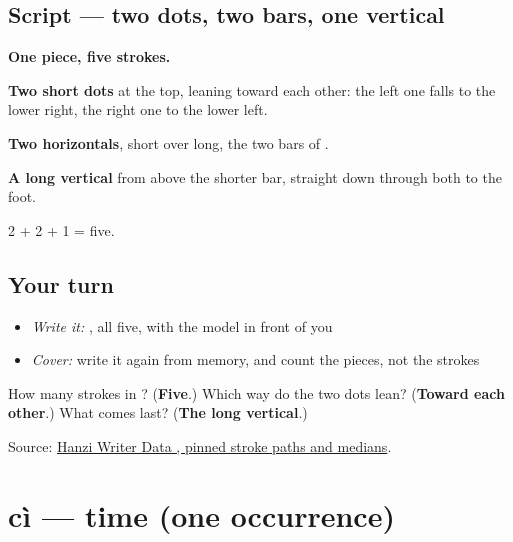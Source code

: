 \subsection*{Script — two dots, two bars, one vertical}

\begin{quote}
\end{quote}

\textbf{One piece, five strokes.}

\textbf{Two short dots} at the top, leaning toward each other: the left one falls to the lower right, the right one to the lower left.

\textbf{Two horizontals}, short over long, the two bars of .

\textbf{A long vertical} from above the shorter bar, straight down through both to the foot.

2 + 2 + 1 = five.

\subsection*{Your turn}
\begin{itemize}
\raggedright
  \item \emph{Write it:} , all five, with the model in front of you
  \item \emph{Cover:} write it again from memory, and count the pieces, not the strokes
\end{itemize}

\begin{tcolorbox}[breakable,colback=teal!4,colframe=teal!35!black,title={Before you move on}]
How many strokes in ? (\textbf{Five}.) Which way do the two dots lean? (\textbf{Toward each other}.) What comes last? (\textbf{The long vertical}.)

Source: \href{https://raw.githubusercontent.com/chanind/hanzi-writer-data/68d10a4b21150cae5e1ebbd223eed289cf32d90c/data/\%E5\%8D\%8A.json}{Hanzi Writer Data , pinned stroke paths and medians}.
\end{tcolorbox}
\section[cì]{cì — time (one occurrence)}

\label{lesson:ZH-C140-ci}



